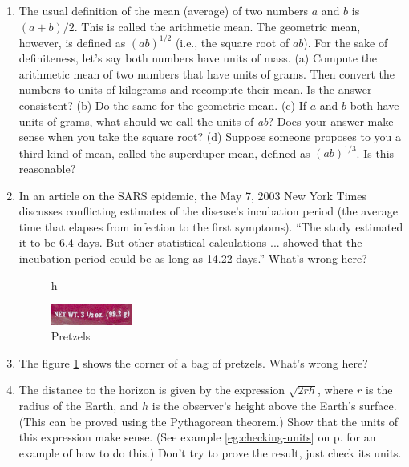 \begin{enumerate}
\item The usual definition of the mean (average) of two
numbers $a$ and $b$ is $(a+b)/2$. This is called the
arithmetic mean. The geometric mean, however, is defined as
$(ab)^{1/2}$ (i.e., the square root of $ab$). For the sake of definiteness, let's say both
numbers have units of mass. (a) Compute the arithmetic mean
of two numbers that have units of grams. Then convert the
numbers to units of kilograms and recompute their mean. Is
the answer consistent? (b) Do the same for the geometric
mean. (c) If $a$ and $b$ both have units of grams, what
should we call the units of \emph{ab}? Does your answer make
sense when you take the square root? (d) Suppose someone
proposes to you a third kind of mean, called the superduper
mean, defined as $(ab)^{1/3}$. Is this reasonable?

\item 
 In an article on the SARS epidemic, the May 7, 2003 New
York Times discusses conflicting estimates of the disease's
incubation period (the average time that elapses from
infection to the first symptoms). ``The study estimated it
to be 6.4 days. But other statistical calculations ...
showed that the incubation period could be as long as 14.22
days.'' What's wrong here?


\begin{figure}{h}
\begin{center}
\includegraphics[width=0.25\textwidth]{./introduction/figs/pretzels}
\caption{ Pretzels}
\label{pretzel}
\end{center}
\end{figure}

\vspace{1.5mm}

\item 
 The figure \ref{pretzel} shows the corner of a bag of pretzels. What's wrong here?


\item 
The distance to the horizon is given by the expression $\sqrt{2rh}$, where $r$ is the
radius of the Earth, and $h$ is the observer's height above the Earth's surface. (This can
be proved using the Pythagorean theorem.) Show that the units of this expression make
sense. (See example \ref{eg:checking-units} on p.
\pageref{eg:checking-units} for an example of how to do this.)
Don't try to prove the result, just check its units.

\end{enumerate}





